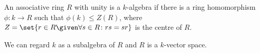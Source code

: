 An associative ring $R$ with unity is a $k$-algebra if there is a ring
homomorphism $\phi\colon k\to R$ such that $\phi(k)\leq Z(R)$, where
$Z = \set{r \in R\given \forall s \in R\colon rs = sr}$ is the centre of $R$.

We can regard $k$ as a subalgebra of $R$ and $R$ is a $k$-vector space.
